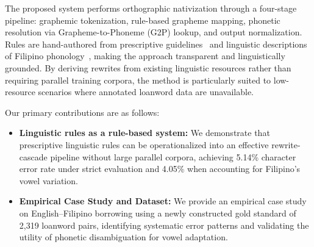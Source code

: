 The proposed system performs orthographic nativization through a four-stage
pipeline: graphemic tokenization, rule-based grapheme mapping, phonetic
resolution via Grapheme-to-Phoneme (G2P) lookup, and output normalization.
Rules are hand-authored from prescriptive guidelines~\cite{almario2014} and
linguistic descriptions of Filipino
phonology~\cite{llamzon1966,schachter1972,llamzon1997,tayao2004,magpale2024},
making the approach transparent and linguistically grounded. By deriving
rewrites from existing linguistic resources rather than requiring parallel
training corpora, the method is particularly suited to low-resource scenarios
where annotated loanword data are unavailable.

Our primary contributions are as follows:
\begin{itemize}
    \item \textbf{Linguistic rules as a rule-based system:} We demonstrate that 
    prescriptive linguistic rules can be operationalized into an effective 
    rewrite-cascade pipeline without large parallel corpora, achieving 5.14\% 
    character error rate under strict evaluation and 4.05\% when accounting for 
    Filipino's vowel variation.
    
    \item \textbf{Empirical Case Study and Dataset:} We provide an empirical 
    case study on English--Filipino borrowing using a newly constructed gold 
    standard of 2,319 loanword pairs, identifying systematic error patterns and 
    validating the utility of phonetic disambiguation for vowel adaptation.
\end{itemize}